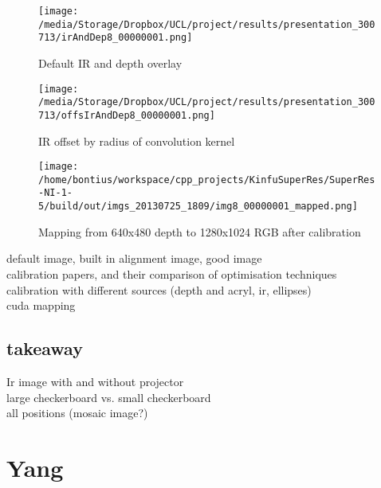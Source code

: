 \documentclass{ucl_thesis}
\begin{document}
\begin{figure}[h!]\centering
    \begin{minipage}[b]{0.49\linewidth} \label{fig:ir}
        \texttt{[image: /media/Storage/Dropbox/UCL/project/results/presentation\_300713/irAndDep8\_00000001.png]}
        \caption{Default IR and depth overlay}
    \end{minipage}
    \begin{minipage}[b]{0.49\linewidth}
        \texttt{[image: /media/Storage/Dropbox/UCL/project/results/presentation\_300713/offsIrAndDep8\_00000001.png]}
        \caption{IR offset by radius of convolution kernel}
    \end{minipage}
\end{figure}

\begin{figure}[h!]\centering
        \texttt{[image: /home/bontius/workspace/cpp\_projects/KinfuSuperRes/SuperRes-NI-1-5/build/out/imgs\_20130725\_1809/img8\_00000001\_mapped.png]}
        \caption{Mapping from 640x480 depth to 1280x1024 RGB after calibration}
\end{figure}


default image, built in alignment image, good image\\
calibration papers, and their comparison of optimisation techniques\\
calibration with different sources (depth and acryl, ir, ellipses)\\
cuda mapping\\


\subsection{takeaway}
Ir image with and without projector\\
large checkerboard vs. small checkerboard\\
all positions (mosaic image?)\\

\section{Yang}
\end{document}
